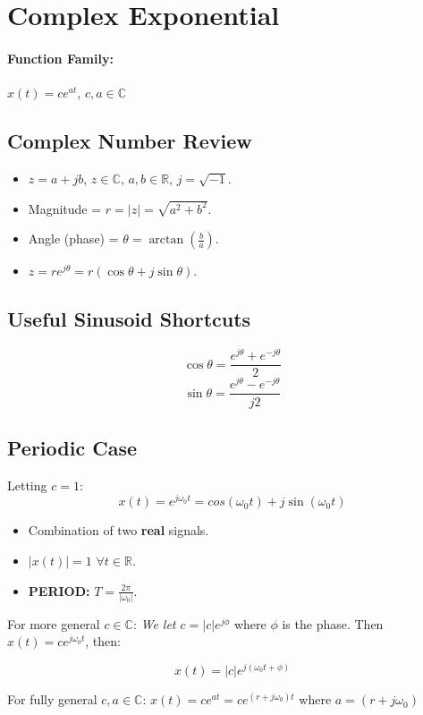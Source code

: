 \documentclass[a4paper,12pt]{report}
\def\reals{\mathbb{R}}
\begin{document}
\section{Complex Exponential}
\paragraph{Function Family: } $x(t) = c e^{at}$, $c, a\in \mathbb{C}$

\subsection{Complex Number Review}
\begin{itemize}
\item $z = a+jb$, $z\in\mathbb{C}$, $a, b \in \mathbb{R}$, $j = \sqrt{-1}$.
\item Magnitude = $r=|z| = \sqrt{a^2 + b^2}$.
\item Angle (phase) = $\theta = \arctan(\frac{b}{a})$.
\item $z = re^{j\theta} = r(\cos\theta + j\sin\theta)$.
\end{itemize}

\subsection{Useful Sinusoid Shortcuts}
$$\cos\theta = \frac{e^{j\theta} + e^{-j\theta}}{2}$$
$$\sin\theta = \frac{e^{j\theta} - e^{-j\theta}}{j2}$$

\subsection{Periodic Case}
Letting $c = 1$:
$$x(t) = e^{j\omega_0 t} = cos(\omega_0 t) + j\sin(\omega_0 t)$$
\begin{itemize}
\item Combination of two \textbf{real} signals.
\item $|x(t)| = 1$ $\forall t\in\reals$.
\item \textbf{PERIOD: } $T=\frac{2\pi}{|\omega_0|}$.
\end{itemize}


For more general $c\in\mathbb{C}$: \textit{We let $c = |c|e^{j\phi}$} where $\phi$ is the phase. Then $x(t) = ce^{j\omega_0 t}$, then: 

$$x(t) = |c|e^{j(\omega_0 t + \phi)}$$

For fully general $c, a \in \mathbb{C}$: $x(t) = ce^{at} = ce^{(r+j\omega_0)t}$ where $a = (r+j\omega_0)$
\end{document}
